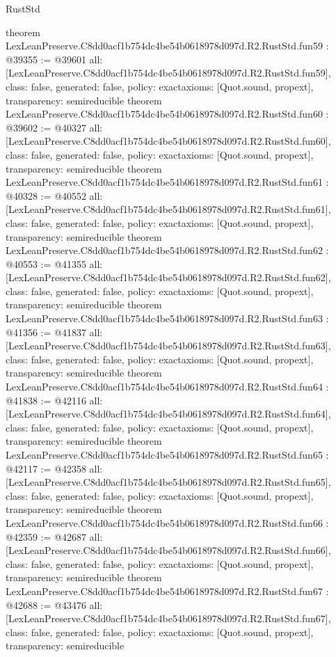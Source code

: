 \begin{lexlean}{RustStd}
\begin{coremodule}
{}
theorem LexLeanPreserve.C8dd0acf1b754dc4be54b0618978d097d.R2.RustStd.fun59 : @39355 := @39601 {
  all: [LexLeanPreserve.C8dd0acf1b754dc4be54b0618978d097d.R2.RustStd.fun59],
  class: false,
  generated: false,
  policy: exact{axioms: [Quot.sound, propext]},
  transparency: semireducible
}
theorem LexLeanPreserve.C8dd0acf1b754dc4be54b0618978d097d.R2.RustStd.fun60 : @39602 := @40327 {
  all: [LexLeanPreserve.C8dd0acf1b754dc4be54b0618978d097d.R2.RustStd.fun60],
  class: false,
  generated: false,
  policy: exact{axioms: [Quot.sound, propext]},
  transparency: semireducible
}
theorem LexLeanPreserve.C8dd0acf1b754dc4be54b0618978d097d.R2.RustStd.fun61 : @40328 := @40552 {
  all: [LexLeanPreserve.C8dd0acf1b754dc4be54b0618978d097d.R2.RustStd.fun61],
  class: false,
  generated: false,
  policy: exact{axioms: [Quot.sound, propext]},
  transparency: semireducible
}
theorem LexLeanPreserve.C8dd0acf1b754dc4be54b0618978d097d.R2.RustStd.fun62 : @40553 := @41355 {
  all: [LexLeanPreserve.C8dd0acf1b754dc4be54b0618978d097d.R2.RustStd.fun62],
  class: false,
  generated: false,
  policy: exact{axioms: [Quot.sound, propext]},
  transparency: semireducible
}
theorem LexLeanPreserve.C8dd0acf1b754dc4be54b0618978d097d.R2.RustStd.fun63 : @41356 := @41837 {
  all: [LexLeanPreserve.C8dd0acf1b754dc4be54b0618978d097d.R2.RustStd.fun63],
  class: false,
  generated: false,
  policy: exact{axioms: [Quot.sound, propext]},
  transparency: semireducible
}
theorem LexLeanPreserve.C8dd0acf1b754dc4be54b0618978d097d.R2.RustStd.fun64 : @41838 := @42116 {
  all: [LexLeanPreserve.C8dd0acf1b754dc4be54b0618978d097d.R2.RustStd.fun64],
  class: false,
  generated: false,
  policy: exact{axioms: [Quot.sound, propext]},
  transparency: semireducible
}
theorem LexLeanPreserve.C8dd0acf1b754dc4be54b0618978d097d.R2.RustStd.fun65 : @42117 := @42358 {
  all: [LexLeanPreserve.C8dd0acf1b754dc4be54b0618978d097d.R2.RustStd.fun65],
  class: false,
  generated: false,
  policy: exact{axioms: [Quot.sound, propext]},
  transparency: semireducible
}
theorem LexLeanPreserve.C8dd0acf1b754dc4be54b0618978d097d.R2.RustStd.fun66 : @42359 := @42687 {
  all: [LexLeanPreserve.C8dd0acf1b754dc4be54b0618978d097d.R2.RustStd.fun66],
  class: false,
  generated: false,
  policy: exact{axioms: [Quot.sound, propext]},
  transparency: semireducible
}
theorem LexLeanPreserve.C8dd0acf1b754dc4be54b0618978d097d.R2.RustStd.fun67 : @42688 := @43476 {
  all: [LexLeanPreserve.C8dd0acf1b754dc4be54b0618978d097d.R2.RustStd.fun67],
  class: false,
  generated: false,
  policy: exact{axioms: [Quot.sound, propext]},
  transparency: semireducible
}
\end{coremodule}
\end{lexlean}
